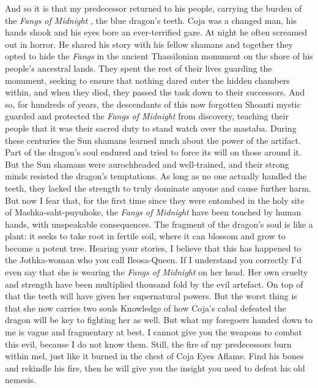 {And so it is that my predecessor returned to his people, carrying the burden of the {\itshape Fangs of Midnight} , the blue dragon's teeth. Coja was a changed man, his hands shook and his eyes bore an ever-terrified gaze. At night he often screamed out in horror. He shared his story with his fellow shamans and together they opted to hide the  {\itshape Fangs} in the ancient Thassilonian monument on the shore of his people's ancestral lands. They spent the rest of their lives guarding the monument, seeking to ensure that nothing dared enter the hidden chambers within, and when they died, they passed the task down to their successors. And so, for hundreds of years, the descendants of this now forgotten Shoanti mystic guarded and protected the  {\itshape Fangs of Midnight} from discovery, teaching their people that it was their sacred duty to stand watch over the mastaba. During these centuries the Sun shamans learned much about the power of the artifact. Part of the dragon's soul endured and tried to force its will on those around it. But the Sun shamans were aurochheaded and well-trained, and their strong minds resisted the dragon's temptations. As long as no one actually handled the teeth, they lacked the strength to truly dominate anyone and cause further harm. But now I fear that, for the first time since they were entombed in the holy site of Mashka-saht-puyuhoke, the  {\itshape Fangs of Midnight} have been touched by human hands, with unspeakable consequences. The fragment of the dragon's soul is like a plant: it seeks to take root in fertile soil, where it can blossom and grow to become a potent tree. Hearing your stories, I believe that this has happened to the Jothka-woman who you call Ileosa-Queen. If I understand you correctly I'd even say that she is wearing the {\itshape Fangs of Midnight} on her head. Her own cruelty and strength have been multiplied thousand fold by the evil artefact. On top of that the teeth will have given her supernatural powers. But the worst thing is that she now carries two souls Knowledge of how Coja's cabal defeated the dragon will be key to fighting her as well. But what my foregoers handed down to me is vague and fragmentary at best. I cannot give you the weapons to combat this evil, because I do not know them. Still, the fire of my predecessors burn within mel, just like it burned in the chest of Coja Eyes Aflame. Find his bones and rekindle his fire, then he will give you the insight you need to defeat his old nemesis.\\

}
